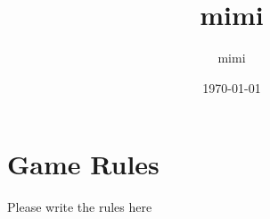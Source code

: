 \documentclass{article}%
\title{mimi}%
\author{mimi}%
\date{\today}%
\begin{document}
%
\normalsize%
\maketitle%
\section{Game Rules}%
\label{sec:GameRules}%
Please write the rules here

%
\end{document}
